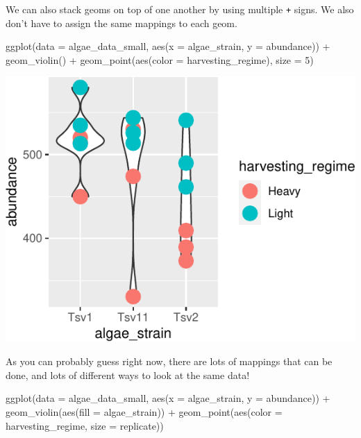 \documentclass[
]{krantz}
\newenvironment{Shaded}{\begin{snugshade}}{\end{snugshade}}
\newcommand{\AttributeTok}[1]{\textcolor[rgb]{0.77,0.63,0.00}{#1}}
\newcommand{\DecValTok}[1]{\textcolor[rgb]{0.00,0.00,0.81}{#1}}
\newcommand{\FunctionTok}[1]{\textcolor[rgb]{0.00,0.00,0.00}{#1}}
\newcommand{\NormalTok}[1]{#1}
\newcommand{\SpecialCharTok}[1]{\textcolor[rgb]{0.00,0.00,0.00}{#1}}
\begin{document}
We can also stack geoms on top of one another by using multiple \texttt{+} signs. We also don't have to assign the same mappings to each geom.

\begin{Shaded}
\begin{Highlighting}[]
\FunctionTok{ggplot}\NormalTok{(}\AttributeTok{data =}\NormalTok{ algae\_data\_small, }\FunctionTok{aes}\NormalTok{(}\AttributeTok{x =}\NormalTok{ algae\_strain, }\AttributeTok{y =}\NormalTok{ abundance)) }\SpecialCharTok{+} 
  \FunctionTok{geom\_violin}\NormalTok{() }\SpecialCharTok{+}
  \FunctionTok{geom\_point}\NormalTok{(}\FunctionTok{aes}\NormalTok{(}\AttributeTok{color =}\NormalTok{ harvesting\_regime), }\AttributeTok{size =} \DecValTok{5}\NormalTok{)}
\end{Highlighting}
\end{Shaded}

\begin{center}\includegraphics[width=0.8\linewidth]{index_files/figure-latex/unnamed-chunk-27-1} \end{center}

As you can probably guess right now, there are lots of mappings that can be done, and lots of different ways to look at the same data!

\begin{Shaded}
\begin{Highlighting}[]
\FunctionTok{ggplot}\NormalTok{(}\AttributeTok{data =}\NormalTok{ algae\_data\_small, }\FunctionTok{aes}\NormalTok{(}\AttributeTok{x =}\NormalTok{ algae\_strain, }\AttributeTok{y =}\NormalTok{ abundance)) }\SpecialCharTok{+}
  \FunctionTok{geom\_violin}\NormalTok{(}\FunctionTok{aes}\NormalTok{(}\AttributeTok{fill =}\NormalTok{ algae\_strain)) }\SpecialCharTok{+}
  \FunctionTok{geom\_point}\NormalTok{(}\FunctionTok{aes}\NormalTok{(}\AttributeTok{color =}\NormalTok{ harvesting\_regime, }\AttributeTok{size =}\NormalTok{ replicate))}
\end{Highlighting}
\end{Shaded}
\end{document}
